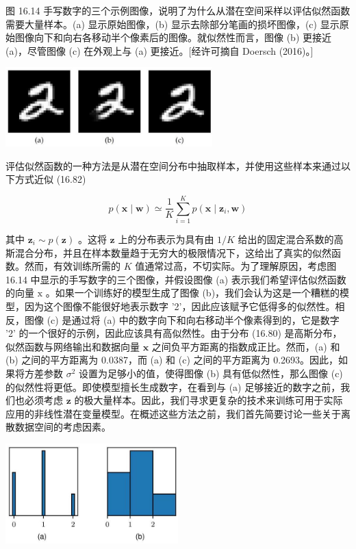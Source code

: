 \documentclass[10pt]{report}
\begin{document}
图 16.14 手写数字的三个示例图像，说明了为什么从潜在空间采样以评估似然函数需要大量样本。(a) 显示原始图像，(b) 显示去除部分笔画的损坏图像，(c) 显示原始图像向下和向右各移动半个像素后的图像。就似然性而言，图像 (b) 更接近 (a)，尽管图像 (c) 在外观上与 (a) 更接近。[经许可摘自 Doersch (2016)。]

\begin{center}
\includegraphics[max width=0.6\textwidth]{images/0194e279-9b28-703a-88f4-c3ac21e2010d_544_741_346_810_310_0.jpg}
\end{center}
\hspace*{3em} 

评估似然函数的一种方法是从潜在空间分布中抽取样本，并使用这些样本来通过以下方式近似 (16.82)

\[
p\left( {\mathbf{x} \mid  \mathbf{w}}\right)  \simeq  \frac{1}{K}\mathop{\sum }\limits_{{i = 1}}^{K}p\left( {\mathbf{x} \mid  {\mathbf{z}}_{i},\mathbf{w}}\right)  \tag{16.83}
\]

其中 \({\mathbf{z}}_{i} \sim  p\left( \mathbf{z}\right)\) 。这将 \(\mathbf{z}\) 上的分布表示为具有由 \(1/K\) 给出的固定混合系数的高斯混合分布，并且在样本数量趋于无穷大的极限情况下，这给出了真实的似然函数。然而，有效训练所需的 \(K\) 值通常过高，不切实际。为了理解原因，考虑图 16.14 中显示的手写数字的三个图像，并假设图像 (a) 表示我们希望评估似然函数的向量 \(\mathrm{x}\) 。如果一个训练好的模型生成了图像 (b)，我们会认为这是一个糟糕的模型，因为这个图像不能很好地表示数字 '2'，因此应该赋予它低得多的似然性。相反，图像 (c) 是通过将 (a) 中的数字向下和向右移动半个像素得到的，它是数字 '2' 的一个很好的示例，因此应该具有高似然性。由于分布 (16.80) 是高斯分布，似然函数与网络输出和数据向量 \(\mathbf{x}\) 之间负平方距离的指数成正比。然而，(a) 和 (b) 之间的平方距离为 0.0387，而 (a) 和 (c) 之间的平方距离为 0.2693。因此，如果将方差参数 \({\sigma }^{2}\) 设置为足够小的值，使得图像 (b) 具有低似然性，那么图像 (c) 的似然性将更低。即使模型擅长生成数字，在看到与 (a) 足够接近的数字之前，我们也必须考虑 \(\mathbf{z}\) 的极大量样本。因此，我们寻求更复杂的技术来训练可用于实际应用的非线性潜在变量模型。在概述这些方法之前，我们首先简要讨论一些关于离散数据空间的考虑因素。

\begin{center}
\includegraphics[max width=0.5\textwidth]{images/0194e279-9b28-703a-88f4-c3ac21e2010d_545_873_345_630_364_0.jpg}
\end{center}
\hspace*{3em} 
\end{document}

